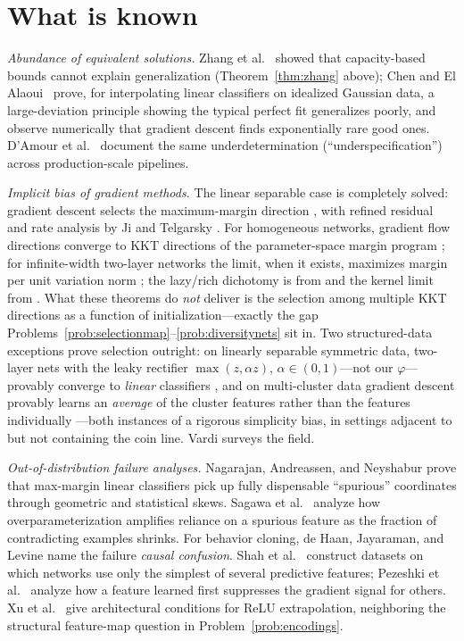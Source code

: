 \documentclass[11pt]{amsart}
\theoremstyle{plain}
\theoremstyle{definition}
\begin{document}
\section{What is known}\label{sec:known}

\emph{Abundance of equivalent solutions.} Zhang et al.~\cite{zhang2017} showed that capacity-based bounds cannot explain generalization (Theorem~\ref{thm:zhang} above); Chen and El Alaoui~\cite{chen2026} prove, for interpolating linear classifiers on idealized Gaussian data, a large-deviation principle showing the typical perfect fit generalizes poorly, and observe numerically that gradient descent finds exponentially rare good ones. D'Amour et al.~\cite{damour2020} document the same underdetermination (``underspecification'') across production-scale pipelines.

\emph{Implicit bias of gradient methods.} The linear separable case is completely solved: gradient descent selects the maximum-margin direction \cite{soudry2018}, with refined residual and rate analysis by Ji and Telgarsky \cite{jitelgarsky2019}. For homogeneous networks, gradient flow directions converge \cite{jitelgarsky2020} to KKT directions of the parameter-space margin program \cite{lyu2020}; for infinite-width two-layer networks the limit, when it exists, maximizes margin per unit variation norm \cite{chizat2020}; the lazy/rich dichotomy is from \cite{chizat2019} and the kernel limit from \cite{jacot2018}. What these theorems do \emph{not} deliver is the selection among multiple KKT directions as a function of initialization---exactly the gap Problems~\ref{prob:selectionmap}--\ref{prob:diversitynets} sit in. Two structured-data exceptions prove selection outright: on linearly separable symmetric data, two-layer nets with the leaky rectifier $\max(z,\alpha z)$, $\alpha\in(0,1)$---not our $\varphi$---provably converge to \emph{linear} classifiers \cite{lyu2021}, and on multi-cluster data gradient descent provably learns an \emph{average} of the cluster features rather than the features individually \cite{li2025}---both instances of a rigorous simplicity bias, in settings adjacent to but not containing the coin line. Vardi \cite{vardi2022} surveys the field.

\emph{Out-of-distribution failure analyses.} Nagarajan, Andreassen, and Neyshabur \cite{nagarajan2021} prove that max-margin linear classifiers pick up fully dispensable ``spurious'' coordinates through geometric and statistical skews. Sagawa et al.~\cite{sagawa2020} analyze how overparameterization amplifies reliance on a spurious feature as the fraction of contradicting examples shrinks. For behavior cloning, de Haan, Jayaraman, and Levine \cite{dehaan2019} name the failure \emph{causal confusion}. Shah et al.~\cite{shah2020} construct datasets on which networks use only the simplest of several predictive features; Pezeshki et al.~\cite{pezeshki2021} analyze how a feature learned first suppresses the gradient signal for others. Xu et al.~\cite{xu2020} give architectural conditions for ReLU extrapolation, neighboring the structural feature-map question in Problem~\ref{prob:encodings}.
\end{document}
